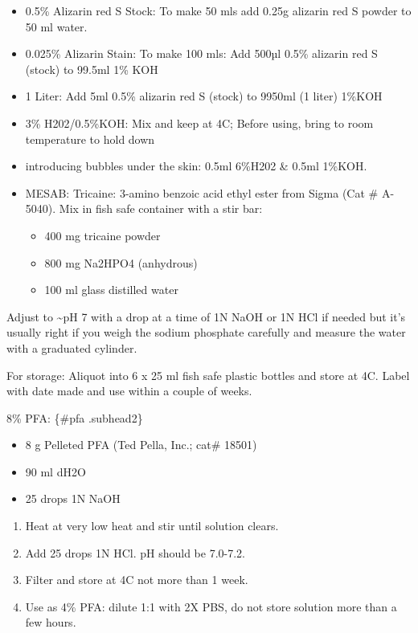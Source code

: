 \documentclass[
]{book}
\providecommand{\tightlist}{%
  \setlength{\itemsep}{0pt}\setlength{\parskip}{0pt}}
\begin{document}
\begin{itemize}
\tightlist
\item
  0.5\% Alizarin red S Stock: To make 50 mls add 0.25g alizarin red S powder to 50 ml water.
\item
  0.025\% Alizarin Stain: To make 100 mls: Add 500µl 0.5\% alizarin red S (stock) to 99.5ml 1\% KOH
\item
  1 Liter: Add 5ml 0.5\% alizarin red S (stock) to 9950ml (1 liter) 1\%KOH
\item
  3\% H202/0.5\%KOH: Mix and keep at 4C; Before using, bring to room temperature to hold down
\item
  introducing bubbles under the skin: 0.5ml 6\%H202 \& 0.5ml 1\%KOH.
\item
  MESAB: Tricaine: 3-amino benzoic acid ethyl ester from Sigma (Cat \# A-5040). Mix in fish safe container with a stir bar:

  \begin{itemize}
  \tightlist
  \item
    400 mg tricaine powder
  \item
    800 mg Na2HPO4 (anhydrous)
  \item
    100 ml glass distilled water
  \end{itemize}
\end{itemize}

Adjust to \textasciitilde pH 7 with a drop at a time of 1N NaOH or 1N HCl if needed
but it's usually right if you weigh the sodium phosphate carefully and
measure the water with a graduated cylinder.

For storage: Aliquot into 6 x 25 ml fish safe plastic bottles and store
at 4C. Label with date made and use within a couple of weeks.

8\% PFA: \{\#pfa .subhead2\}

\begin{itemize}
\tightlist
\item
  8 g Pelleted PFA (Ted Pella, Inc.; cat\# 18501)
\item
  90 ml dH2O
\item
  25 drops 1N NaOH
\end{itemize}

\begin{enumerate}
\def\labelenumi{\arabic{enumi}.}
\tightlist
\item
  Heat at very low heat and stir until solution clears.
\item
  Add 25 drops 1N HCl. pH should be 7.0-7.2.
\item
  Filter and store at 4C not more than 1 week.
\item
  Use as 4\% PFA: dilute 1:1 with 2X PBS, do not store solution more
  than a few hours.
\end{enumerate}
\end{document}
